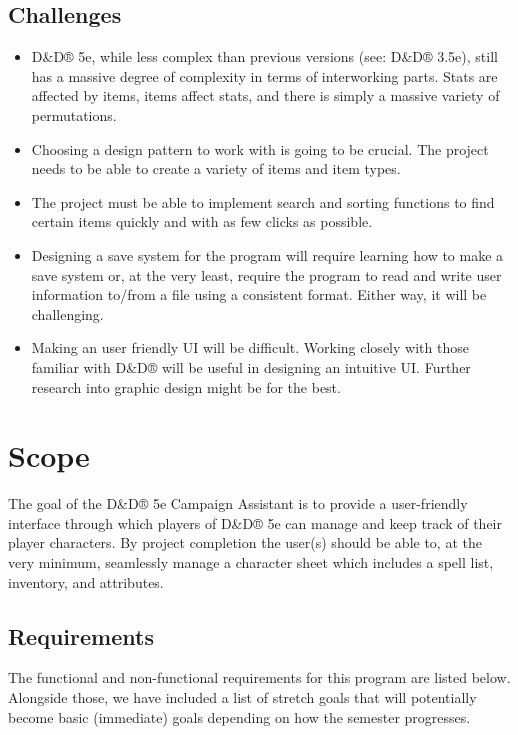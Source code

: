 \documentclass[10pt,conference,onecolumn,compsoc]{IEEEtran}
\begin{document}
\subsection{Challenges}
\begin{itemize}[leftmargin=*]
\item D\&D® 5e, while less complex than previous versions (see: D\&D® 3.5e), still has a massive degree of complexity in terms of interworking parts. Stats are affected by items, items affect stats, and there is simply a massive variety of permutations.
\item Choosing a design pattern to work with is going to be crucial. The project needs to be able to create a variety of items and item types.
\item The project must be able to implement search and sorting functions to find certain items quickly and with as few clicks as possible.
\item Designing a save system for the program will require learning how to make a save system or, at the very least, require the program to read and write user information to/from a file using a consistent format. Either way, it will be challenging.
\item Making an user friendly UI will be difficult. Working closely with those familiar with D\&D® will be useful in designing an intuitive UI. Further research into graphic design might be for the best.
\end{itemize}

\section{Scope}
The goal of the D\&D® 5e Campaign Assistant is to provide a user-friendly interface through which players of D\&D® 5e can manage and keep track of their player characters. By project completion the user(s) should be able to, at the very minimum, seamlessly manage a character sheet which includes a spell list, inventory, and attributes.
\subsection{Requirements}
The functional and non-functional requirements for this program are listed below. Alongside those, we have included a list of stretch goals that will potentially become basic (immediate) goals depending on how the semester progresses.

\end{document}
